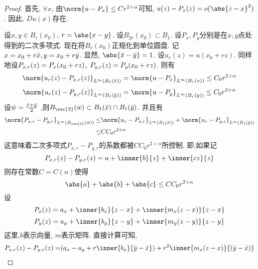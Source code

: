\begin{proof}
    首先, $\forall x$, 由$\norm{u-P_x} \le Cr^{2+\alpha}$可知, $u(z)-P_x(z)=o(\abs{z-x}^2)$. 因此, $Du(x)$存在.
    \par 设$x,y \in B_r(x_0)$, $r=\abs{x-y}$.  设$B_{2r}(x_0)\subset B_1$. 设$P_x,P_y$分别是在$x,y$点处得到的二次多项式. 现在将$B_r(x_0)$正规化到单位圆盘. 记 $x=x_0+r{\bar{x}}, y=x_0+r{\bar{y}}$. 显然, $\abs{\bx-\by}=1$. 设$u_r(z)=u(x_0+rz)$. 同样地设${P_{x,r}(z)}=P_x(x_0+rz)$, ${P_{y,r}(z)}=P_y(x_0+rz)$. 则有
    \begin{equation}
        \norm{u_r(z)-\px{z}}_{L^\infty(B_1(\bx))} = \norm{u-P_x}_{L^\infty(B_r(x))} \le C_0r^{2+\alpha}
    \end{equation}
    \begin{equation}
        \norm{u_r(z)-\py{z}}_{L^\infty(B_1(\by))} = \norm{u-P_y}_{L^\infty(B_r(y))} \le C_0r^{2+\alpha}
    \end{equation}
    设$\bar{w}=\frac{{\bar{x}}+{\bar{y}}}{2}$ ,则$B_\rec{2}(\bar{w}) \subset B_1(\bar{x}) \cap B_1(\bar{y})$. 并且有
    \begin{equation}
        \begin{split}
            \norm{P_{x,r}-P_{y,r}}_{L^\infty(B_\rec{2}(\bar{w}))} \le& \norm{u_r-P_{x,r}}_{L^\infty(B_1(\bar{x}))}+\norm{u_r-P_{y,r}}_{L^\infty(B_1(\bar{y}))} \\
            \le& CC_0r^{2+\alpha}
        \end{split}
    \end{equation}
    这意味着二次多项式$P_{x,r}-P_{y,r}$的系数都被$CC_0r^{2+\alpha}$所控制. 即,如果记
    \begin{equation}
        P_{x,r}(z)-P_{y,r}(z)=a+\inner{b}{z}+\inner{cz}{z}
    \end{equation}
    则存在常数$C=C(n)$使得
    \begin{equation} \label{holder_coeff}
        \abs{a} +\abs{b}+\abs{c}\le CC_0r^{2+\alpha}
    \end{equation}
    设
    \begin{equation}
        P_x(z)=a_x+\inner{b_x}{z-x}+\inner{m_x(z-x)}{z-x}
    \end{equation}
    \begin{equation}
        P_y(z)=a_y+\inner{b_y}{z-y}+\inner{m_y(z-y)}{z-y}
    \end{equation}
    这里,$b$表示向量, $m$表示矩阵. 直接计算可知,
    \begin{equation}
        \begin{split}
            P_{x,r}(z)-P_{y,r}(z)=&(a_x-a_y+r\inner{b_x}{\bar{y}-\bar{x}})+r^2\inner{m_x(z-x)}{(\bar{y}-\bar{x})} \\

\end{split}
\end{equation}
\end{proof}
